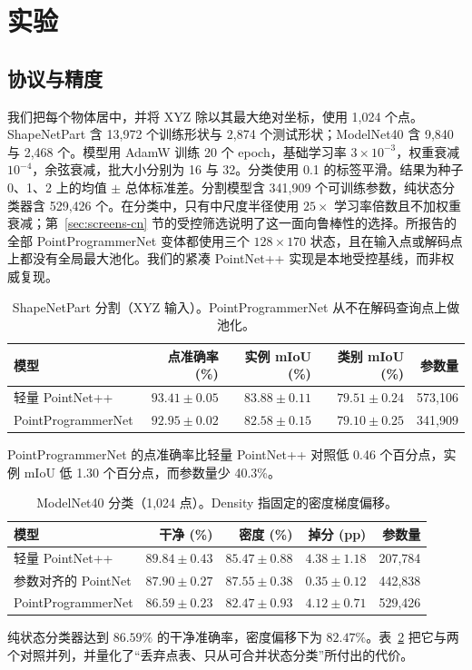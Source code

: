 \documentclass[UTF8,a4paper,11pt,fontset=windows]{ctexart}
\begin{document}
\section{实验}
\subsection{协议与精度}
我们把每个物体居中，并将 XYZ 除以其最大绝对坐标，使用 1,024 个点。ShapeNetPart 含 13,972 个训练形状与 2,874 个测试形状；ModelNet40 含 9,840 与 2,468 个。模型用 AdamW 训练 20 个 epoch，基础学习率 $3\times10^{-3}$，权重衰减 $10^{-4}$，余弦衰减，批大小分别为 16 与 32。分类使用 0.1 的标签平滑。结果为种子 0、1、2 上的均值 $\pm$ 总体标准差。分割模型含 341,909 个可训练参数，纯状态分类器含 529,426 个。在分类中，只有中尺度半径使用 $25\times$ 学习率倍数且不加权重衰减；第~\ref{sec:screens-cn} 节的受控筛选说明了这一面向鲁棒性的选择。所报告的全部 PointProgrammerNet 变体都使用三个 $128\times170$ 状态，且在输入点或解码点上都没有全局最大池化。我们的紧凑 PointNet++ 实现是本地受控基线，而非权威复现。

\begin{table}[t]
\centering
\caption{ShapeNetPart 分割（XYZ 输入）。PointProgrammerNet 从不在解码查询点上做池化。}
\label{tab:segmentation_accuracy_cn}
\begin{tabular}{lrrrr}
\toprule
模型 & 点准确率 (\%) & 实例 mIoU (\%) & 类别 mIoU (\%) & 参数量 \\
\midrule
轻量 PointNet++ & $93.41\pm0.05$ & $83.88\pm0.11$ & $79.51\pm0.24$ & 573,106 \\
PointProgrammerNet & $92.95\pm0.02$ & $82.58\pm0.15$ & $79.10\pm0.25$ & 341,909 \\
\bottomrule
\end{tabular}
\end{table}
PointProgrammerNet 的点准确率比轻量 PointNet++ 对照低 0.46 个百分点，实例 mIoU 低 1.30 个百分点，而参数量少 40.3\%。

\begin{table}[t]
\centering
\caption{ModelNet40 分类（1,024 点）。Density 指固定的密度梯度偏移。}
\label{tab:classification_accuracy_cn}
\begin{tabular}{lrrrr}
\toprule
模型 & 干净 (\%) & 密度 (\%) & 掉分 (pp) & 参数量 \\
\midrule
轻量 PointNet++ & $89.84\pm0.43$ & $85.47\pm0.88$ & $4.38\pm1.18$ & 207,784 \\
参数对齐的 PointNet & $87.90\pm0.27$ & $87.55\pm0.38$ & $0.35\pm0.12$ & 442,838 \\
PointProgrammerNet & $86.59\pm0.23$ & $82.47\pm0.93$ & $4.12\pm0.71$ & 529,426 \\
\bottomrule
\end{tabular}
\end{table}
纯状态分类器达到 $86.59\%$ 的干净准确率，密度偏移下为 $82.47\%$。表~\ref{tab:classification_accuracy_cn} 把它与两个对照并列，并量化了“丢弃点表、只从可合并状态分类”所付出的代价。
\end{document}
